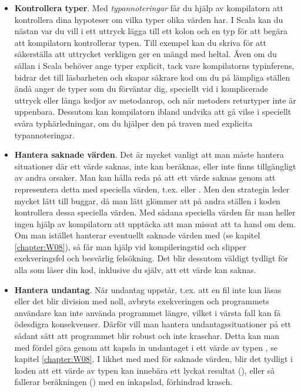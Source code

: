 \begin{itemize}
\item \textbf{Kontrollera typer}. Med \textit{typannoteringar} får du hjälp av kompilatorn att kontrollera dina hypoteser om vilka typer olika värden har. I Scala kan du nästan var du vill i ett uttryck lägga till ett kolon och en typ för att begära att kompilatorn kontrollerar typen. Till exempel kan du skriva  för att säkerställa att uttrycket  verkligen ger en mängd med heltal. Även om du sällan i Scala behöver ange typer explicit, tack vare kompilatorns typinferens, bidrar det till läsbarheten och skapar säkrare kod om du på lämpliga ställen ändå anger de typer som du förväntar dig, speciellt vid i komplicerade uttryck eller långa kedjor av metodanrop, och när metoders returtyper inte är uppenbara. Dessutom kan kompilatorn ibland undvika att gå vilse i speciellt svåra typhärledningar, om du hjälper den på traven med explicita typannoteringar.

\item \textbf{Hantera saknade värden}. Det är mycket vanligt att man måste hantera situationer där ett värde saknas, inte kan beräknas, eller inte finns tillgängligt av andra orsaker. Man kan hålla reda på att ett värde saknas genom att representera detta med speciella värden, t.ex.  eller . Men den strategin leder mycket lätt till buggar, då man lätt glömmer att på andra ställen i koden kontrollera dessa speciella värden. Med sådana speciella värden får man heller ingen hjälp av kompilatorn att upptäcka att man missat att ta hand om dem. Om man istället hanterar eventuellt saknade värden med  (se kapitel \ref{chapter:W08}), så får man hjälp vid kompileringstid och slipper exekveringsfel och besvärlig felsökning. Det blir dessutom väldigt tydligt för alla som läser din kod, inklusive du själv, att ett värde kan saknas.
 
\item \textbf{Hantera undantag}. När undantag uppstår, t.ex. att en fil inte kan läsas eller det blir division med noll, avbryts exekveringen och programmets användare kan inte använda programmet längre, vilket i värsta fall kan få ödesdigra konsekvenser. Därför vill man hantera undantagssituationer på ett sådant sätt att programmet blir robust och inte kraschar. Detta kan man med fördel göra genom att kapsla in undantaget i ett värde av typen , se kapitel \ref{chapter:W08}. I likhet med med  för saknade värden, blir det tydligt i koden att ett värde av typen  kan innebära ett lyckat resultat (), eller så fallerar beräkningen () med en inkapslad, förhindrad krasch. 


\end{itemize}
